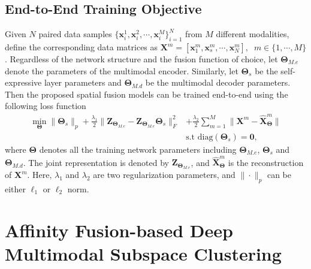 \documentclass[journal]{IEEEtran}
\begin{document}
\subsection{End-to-End Training Objective}
Given $N$ paired data samples $\{\mathbf{x}_{i}^{1}, \mathbf{x}_{i}^{2}, \cdots, \mathbf{x}_{i}^{M}\}_{i=1}^{N}$ from $M$ different modalities, define the corresponding data matrices as $\mathbf{X}^{m}=[\mathbf{x}_{1}^{m}, \mathbf{x}_{s}^{m}, \cdots, \mathbf{x}_{N}^{m}],  \;\;m \in \{1,\cdots,M\}$.  Regardless of the network structure and the fusion function of choice, let  $\boldsymbol{\Theta}_{M.e}$ denote the parameters of the multimodal encoder.		 Similarly, let $\boldsymbol{\Theta}_{s}$ be the self-expressive layer parameters and $\boldsymbol{\Theta}_{M.d}$ be the multimodal decoder parameters.  Then the proposed spatial fusion models can be  trained end-to-end using the following loss function 
\begin{align}\label{eq:SFDMSC}
\nonumber \min_{\boldsymbol{\Theta}}  \|\boldsymbol{\Theta}_{s}\|_{p}+\frac{\lambda_1}{2}\|\mathbf{Z}_{\boldsymbol{\Theta}_{M.e}} - \mathbf{Z}_{\boldsymbol{\Theta}_{M.e}}\boldsymbol{\Theta}_{s}\|_{F}^{2} &+  \frac{\lambda_2}{2} \sum^{M}_{m=1} \| \mathbf{X}^m - \hat{\mathbf{X}}^m_{\boldsymbol{\Theta}}\|\\
&\text{s.t  }\text{diag}(\boldsymbol{\Theta}_{s})=\mathbf{0}, 
\end{align}where $\boldsymbol{\Theta}$ denotes all the training network parameters including $\boldsymbol{\Theta}_{M.e}$, $\boldsymbol{\Theta}_{s}$  and $\boldsymbol{\Theta}_{M.d}$.		The joint representation is denoted by $\mathbf{Z}_{\boldsymbol{\Theta}_{M.e}}$, and $\hat{\mathbf{X}}^m_{\boldsymbol{\Theta}}$ is the reconstruction of $\mathbf{X}^m$. Here, $\lambda_{1}$ and $\lambda_{2}$ are two regularization parameters,  and  $\|\cdot \|_{p}$  can be either $\ell_1$ or $\ell_2$ norm. 



\section{Affinity Fusion-based Deep Multimodal Subspace Clustering}\label{sec:affinity}
\end{document}
